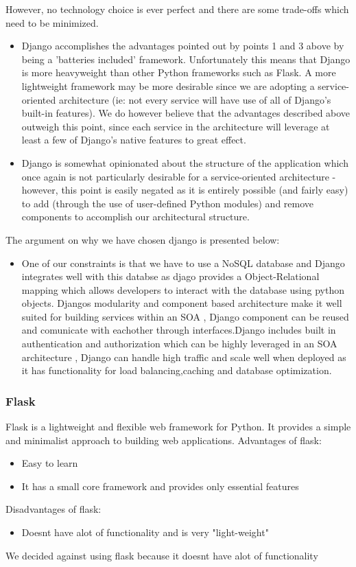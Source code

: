 \documentclass[12pt]{article}
\begin{document}
However, no technology choice is ever perfect and there are some trade-offs which need to be minimized.
\begin{itemize}
    \item Django accomplishes the advantages pointed out by points 1 and 3 above by being a 'batteries included' framework. Unfortunately this means that Django is more heavyweight than other Python frameworks such as Flask. A more lightweight framework may be more desirable since we are adopting a service-oriented architecture (ie: not every service will have use of all of Django's built-in features). We do however believe that the advantages described above outweigh this point, since each service in the architecture will leverage at least a few of Django's native features to great effect.
    \item Django is somewhat opinionated about the structure of the application which once again is not particularly desirable for a service-oriented architecture - however, this point is easily negated as it is entirely possible (and fairly easy) to add (through the use of user-defined Python modules) and remove components to accomplish our architectural structure.
\end{itemize}
The argument on why we have chosen django is presented below:
\begin{itemize}
    \item One of our constraints is that we have to use a NoSQL database and Django integrates well with this databse as djago provides a Object-Relational mapping which allows developers to interact with the database using python objects. Djangos modularity and component based architecture make it well suited for building services within an SOA , Django component can be reused and comunicate with eachother through interfaces.Django includes built in authentication and authorization which can be highly leveraged in an SOA architecture , Django can handle high traffic and scale well when deployed as it has functionality for load balancing,caching and database optimization.
\end{itemize}

\subsubsection{Flask}
Flask is a lightweight and flexible web framework for Python. It provides a simple and minimalist approach to building web applications.
Advantages of flask:
\begin{itemize}
    \item Easy to learn
    \item It has a small core framework and provides only essential features
\end{itemize}
Disadvantages of flask:
\begin{itemize}
    \item Doesnt have alot of functionality and is very "light-weight"
\end{itemize}
We decided against using flask because it doesnt have alot of functionality
\end{document}
